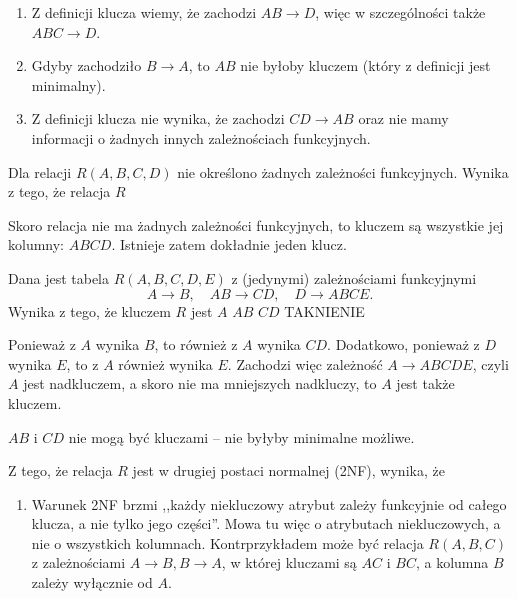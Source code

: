 \begin{solutions}
    \begin{enumerate}[\bf A.]
    	\item Z definicji klucza wiemy, że zachodzi $AB \to D$, więc w szczególności także $ABC \to D$.
    	\item Gdyby zachodziło $B \to A$, to $AB$ nie byłoby kluczem (który z definicji jest minimalny).
    	\item Z definicji klucza nie wynika, że zachodzi $CD \to AB$ oraz nie mamy informacji o żadnych innych zależnościach funkcyjnych.
    \end{enumerate}

    \sol Dla relacji $R(A,B,C,D)$ nie określono żadnych zależności funkcyjnych. Wynika z tego, że relacja $R$
    
    Skoro relacja nie ma żadnych zależności funkcyjnych, to kluczem są wszystkie jej kolumny: $ABCD$. Istnieje zatem dokładnie jeden klucz.

    \sol Dana jest tabela $R(A, B, C, D, E)$ z (jedynymi) zależnościami funkcyjnymi $$A \rightarrow B, \quad AB \rightarrow CD, \quad D \rightarrow ABCE.$$ Wynika z tego, że kluczem $R$ jest
    \answerss
    {$A$}
    {$AB$}
    {$CD$}
    {TAK}{NIE}{NIE}

	Ponieważ z $A$ wynika $B$, to również z $A$ wynika $CD$. Dodatkowo, ponieważ z $D$ wynika $E$, to z $A$ również wynika $E$. Zachodzi więc zależność $A \to ABCDE$, czyli $A$ jest nadkluczem, a skoro nie ma mniejszych nadkluczy, to $A$ jest także kluczem.
	
	$AB$ i $CD$ nie mogą być kluczami -- nie byłyby minimalne możliwe.

    \sol Z tego, że relacja $R$ jest w drugiej postaci normalnej (2NF), wynika, że
    
    \begin{enumerate}[\bf A.]
    	\item Warunek 2NF brzmi ,,każdy niekluczowy atrybut zależy funkcyjnie od całego klucza, a nie tylko jego części''. Mowa tu więc o atrybutach niekluczowych, a nie o wszystkich kolumnach. Kontrprzykładem może być relacja $R(A, B, C)$ z zależnościami $A \to B, B \to A$, w której kluczami są $AC$ i $BC$, a kolumna $B$ zależy wyłącznie od $A$.
    	

\end{enumerate}
\end{solutions}
